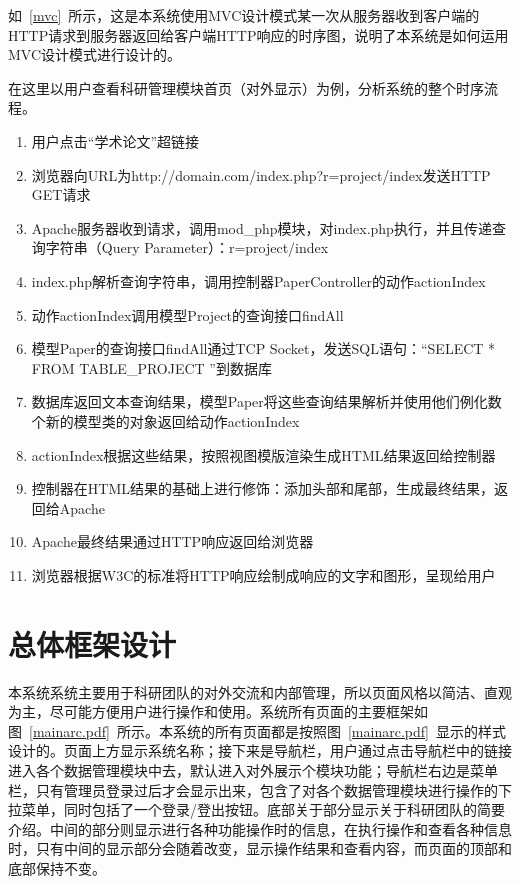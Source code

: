 如~\ref{mvc}~所示，这是本系统使用MVC设计模式某一次从服务器收到客户端的HTTP请求到服务器返回给客户端HTTP响应的时序图，说明了本系统是如何运用MVC设计模式进行设计的。

在这里以用户查看科研管理模块首页（对外显示）为例，分析系统的整个时序流程。
\begin{enumerate}
\item 用户点击“学术论文”超链接
\item 浏览器向URL为http://domain.com/index.php?r=project/index发送HTTP GET请求
\item Apache服务器收到请求，调用mod\_php模块，对index.php执行，并且传递查询字符串（Query Parameter）：r=project/index
\item index.php解析查询字符串，调用控制器PaperController的动作actionIndex
\item 动作actionIndex调用模型Project的查询接口findAll
\item 模型Paper的查询接口findAll通过TCP Socket，发送SQL语句：“SELECT * FROM TABLE\_PROJECT ”到数据库
\item 数据库返回文本查询结果，模型Paper将这些查询结果解析并使用他们例化数个新的模型类的对象返回给动作actionIndex
\item actionIndex根据这些结果，按照视图模版渲染生成HTML结果返回给控制器
\item 控制器在HTML结果的基础上进行修饰：添加头部和尾部，生成最终结果，返回给Apache
\item Apache最终结果通过HTTP响应返回给浏览器
\item 浏览器根据W3C的标准将HTTP响应绘制成响应的文字和图形，呈现给用户 
\end{enumerate}

\section{总体框架设计}

本系统系统主要用于科研团队的对外交流和内部管理，所以页面风格以简洁、直观为主，尽可能方便用户进行操作和使用。系统所有页面的主要框架如图~\ref{mainarc.pdf}~所示。本系统的所有页面都是按照图~\ref{mainarc.pdf}~显示的样式设计的。页面上方显示系统名称；接下来是导航栏，用户通过点击导航栏中的链接进入各个数据管理模块中去，默认进入对外展示个模块功能；导航栏右边是菜单栏，只有管理员登录过后才会显示出来，包含了对各个数据管理模块进行操作的下拉菜单，同时包括了一个登录/登出按钮。底部关于部分显示关于科研团队的简要介绍。中间的部分则显示进行各种功能操作时的信息，在执行操作和查看各种信息时，只有中间的显示部分会随着改变，显示操作结果和查看内容，而页面的顶部和底部保持不变。

